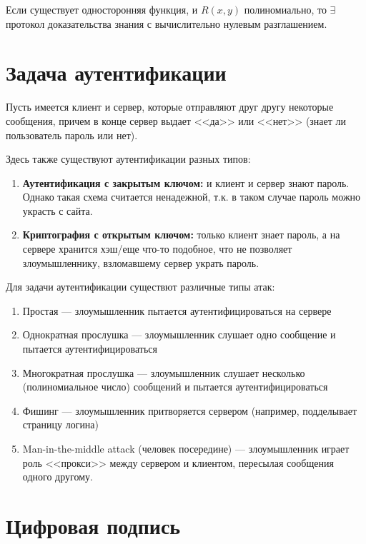 \begin{theorem}[б/д]
    Если существует односторонняя функция, и \(R(x, y)\) полиномиально, то \(\exists\) протокол доказательства знания с вычислительно нулевым разглашением.
\end{theorem}

\section{Задача аутентификации}

Пусть имеется клиент и сервер, которые отправляют друг другу некоторые сообщения, причем в конце сервер выдает <<да>> или <<нет>> (знает ли пользователь пароль или нет). 

Здесь также существуют аутентификации разных типов:
\begin{enumerate}
    \item \textbf{Аутентификация с закрытым ключом:} и клиент и сервер знают пароль. Однако такая схема считается ненадежной, т.к. в таком случае пароль можно украсть с сайта.
    \item \textbf{Криптография с открытым ключом:} только клиент знает пароль, а на сервере хранится хэш/еще что-то подобное, что не позволяет злоумышленнику, взломавшему сервер украть пароль.
\end{enumerate}

Для задачи аутентификации существют различные типы атак:
\begin{enumerate}
    \item Простая --- злоумышленник пытается аутентифицироваться на сервере
    \item Однократная прослушка --- злоумышленник слушает одно сообщение и пытается аутентифицироваться
    \item Многократная прослушка --- злоумышленник слушает несколько (полиномиальное число) сообщений и пытается аутентифицироваться
    \item Фишинг --- злоумышленник притворяется сервером (например, подделывает страницу логина)
    \item Man-in-the-middle attack (человек посередине) --- злоумышленник играет роль <<прокси>> между сервером и клиентом, пересылая сообщения одного другому.
\end{enumerate}


\section{Цифровая подпись}

